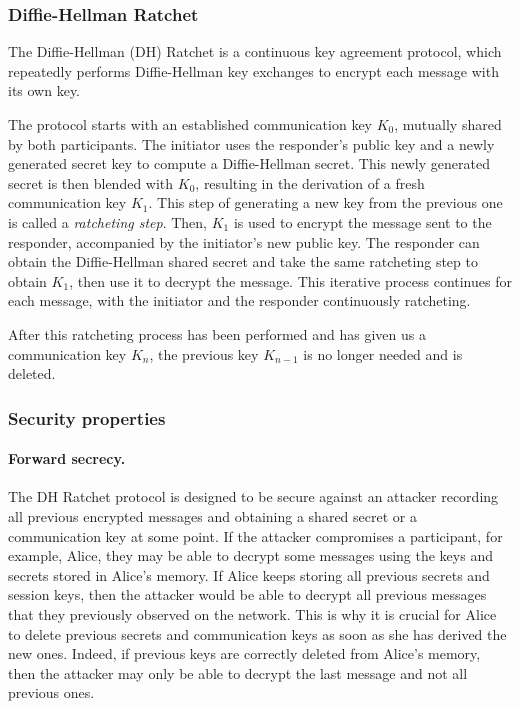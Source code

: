 \subsubsection{Diffie-Hellman Ratchet}
\label{sec:diffie-hellman-ratchet}

The Diffie-Hellman (DH) Ratchet is a continuous key agreement protocol, which repeatedly performs Diffie-Hellman key exchanges to encrypt each message with its own key.

The protocol starts with an established communication key $K_0$, mutually shared by both participants.
The initiator uses the responder's public key and a newly generated secret key to compute a Diffie-Hellman secret. 
This newly generated secret is then blended with $K_0$, resulting in the derivation of a fresh communication key $K_1$.
This step of generating a new key from the previous one is called a \emph{ratcheting step}.
Then, $K_1$ is used to encrypt the message sent to the responder, accompanied by the initiator's new public key.
The responder can obtain the Diffie-Hellman shared secret and take the same ratcheting step to obtain $K_1$, then use it to decrypt the message.
This iterative process continues for each message, with the initiator and the responder continuously ratcheting.

After this ratcheting process has been performed and has given us a communication key $K_n$, the previous key $K_{n-1}$ is no longer needed and is deleted.

\subsubsection{Security properties}
\label{sec:security-properties}

\paragraph{Forward secrecy.}
\label{sec:forward-secrecy}

The DH Ratchet protocol is designed to be secure against an attacker recording all previous encrypted messages and obtaining a shared secret or a communication key at some point.
If the attacker compromises a participant, for example, Alice, they may be able to decrypt some messages using the keys and secrets stored in Alice's memory. If Alice keeps storing all previous secrets and session keys, then the attacker would be able to decrypt all previous messages that they previously observed on the network. This is why it is crucial for Alice to delete previous secrets and communication keys as soon as she has derived the new ones.
Indeed, if previous keys are correctly deleted from Alice's memory, then the attacker may only be able to decrypt the last message and not all previous ones.


